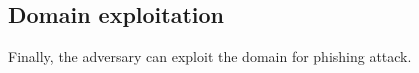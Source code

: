 

\subsection{Domain exploitation}

Finally, the adversary can exploit the domain for phishing attack. 
